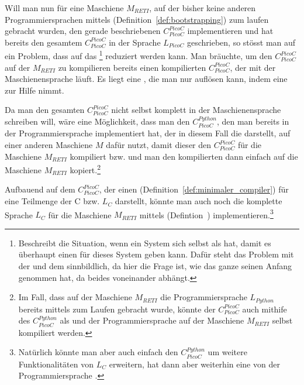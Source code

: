 Will man nun für eine Maschiene $M_{RETI}$, auf der bisher keine anderen Programmiersprachen mittels  (Definition~\ref{def:bootstrapping}) zum laufen gebracht wurden, den gerade beschriebenen  $C_{PicoC}^{PicoC}$ implementieren und hat bereits den gesamtem  $C_{PicoC}^{PicoC}$ in der Sprache  $L_{PicoC}$ geschrieben, so stösst man auf ein Problem, dass auf das \footnote{Beschreibt die Situation, wenn ein System sich selbst als  hat, damit es überhaupt einen  für dieses System geben kann. Dafür steht das Problem mit der  und dem  sinnbildlich, da hier die Frage ist, wie das ganze seinen Anfang genommen hat, da beides  voneinander abhängt.} reduziert werden kann. Man bräuchte, um den  $C_{PicoC}^{PicoC}$ auf der  $M_{RETI}$ zu kompilieren bereits einen kompilierten  $C_{PicoC}^{PicoC}$, der mit der Maschienensprache  läuft. Es liegt eine , die man nur auflösen kann, indem eine  zur Hilfe nimmt.

Da man den gesamten  $C_{PicoC}^{PicoC}$ nicht selbst komplett in der Maschienensprache  schreiben will, wäre eine Möglichkeit, dass man den  $C_{PicoC}^{Python}$, den man bereits in der Programmiersprache  implementiert hat, der in diesem Fall die  darstellt, auf einer anderen Maschiene $M$ dafür nutzt, damit dieser den  $C_{PicoC}^{PicoC}$ für die Maschiene $M_{RETI}$ kompiliert bzw.  und man den kompilierten  dann einfach auf die Maschiene $M_{RETI}$ kopiert.\footnote{Im Fall, dass auf der Maschiene $M_{RETI}$ die Programmiersprache $L_{Python}$ bereits mittels  zum Laufen gebracht wurde, könnte der  $C_{PicoC}^{PicoC}$ auch mithife des  $C_{PicoC}^{Python}$ als  und der Programmiersprache  auf der Maschiene $M_{RETI}$ selbst kompiliert werden.}

Aufbauend auf dem  $C_{PicoC}^{PicoC}$, der einen  (Definition~\ref{def:minimaler_compiler}) für eine Teilmenge der  C bzw. $L_C$ darstellt, könnte man auch noch die komplette Sprache $L_C$ für die Maschiene $M_{RETI}$ mittels  (Defintion~) implementieren.\footnote{Natürlich könnte man aber auch einfach den  $C_{PicoC}^{Python}$ um weitere Funktionalitäten von $L_C$ erweitern, hat dann aber weiterhin eine  von der Programmiersprache .}

